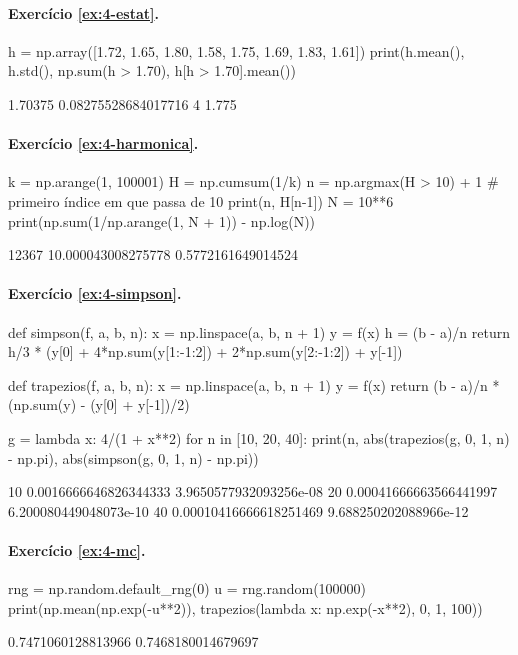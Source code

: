 \paragraph{Exercício \ref{ex:4-estat}.}
\begin{entrada}
h = np.array([1.72, 1.65, 1.80, 1.58, 1.75, 1.69, 1.83, 1.61])
print(h.mean(), h.std(), np.sum(h > 1.70), h[h > 1.70].mean())
\end{entrada}
\begin{saida}
1.70375 0.08275528684017716 4 1.775
\end{saida}

\paragraph{Exercício \ref{ex:4-harmonica}.}
\begin{entrada}
k = np.arange(1, 100001)
H = np.cumsum(1/k)
n = np.argmax(H > 10) + 1          # primeiro índice em que passa de 10
print(n, H[n-1])
N = 10**6
print(np.sum(1/np.arange(1, N + 1)) - np.log(N))
\end{entrada}
\begin{saida}
12367 10.000043008275778
0.5772161649014524
\end{saida}

\paragraph{Exercício \ref{ex:4-simpson}.}
\begin{entrada}
def simpson(f, a, b, n):
    x = np.linspace(a, b, n + 1)
    y = f(x)
    h = (b - a)/n
    return h/3 * (y[0] + 4*np.sum(y[1:-1:2]) + 2*np.sum(y[2:-1:2]) + y[-1])

def trapezios(f, a, b, n):
    x = np.linspace(a, b, n + 1)
    y = f(x)
    return (b - a)/n * (np.sum(y) - (y[0] + y[-1])/2)

g = lambda x: 4/(1 + x**2)
for n in [10, 20, 40]:
    print(n, abs(trapezios(g, 0, 1, n) - np.pi), abs(simpson(g, 0, 1, n) - np.pi))
\end{entrada}
\begin{saida}
10 0.0016666646826344333 3.9650577932093256e-08
20 0.00041666663566441997 6.200080449048073e-10
40 0.00010416666618251469 9.688250202088966e-12
\end{saida}

\paragraph{Exercício \ref{ex:4-mc}.}
\begin{entrada}
rng = np.random.default_rng(0)
u = rng.random(100000)
print(np.mean(np.exp(-u**2)), trapezios(lambda x: np.exp(-x**2), 0, 1, 100))
\end{entrada}
\begin{saida}
0.7471060128813966 0.7468180014679697
\end{saida}

